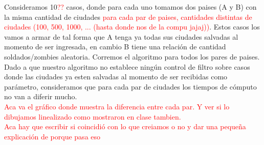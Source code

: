 Consideramos 10\textcolor{red}{??} casos, donde para cada uno tomamos dos paises (A y B) con la misma cantidad de ciudades \textcolor{red}{para cada par de paises, cantidades distintas de ciudades (100, 500, 1000, ... (hasta donde nos de la compu jajaj))}. Estos casos los vamos a armar de tal forma que A tenga ya todas sus ciudades salvadas al momento de ser ingresada, en cambio B tiene una relaci\'on de cantidad soldados/zombies aleatoria. Corremos el algoritmo para todos los pares de paises.\\

Dado a que nuestro algoritmo no establece ning\'un control de filtro sobre casos donde las ciudades ya esten salvadas al momento de ser recibidas como par\'ametro, consideramos que para cada par de ciudades los tiempos de c\'omputo no van a diferir mucho.\\

\textcolor{red}{Aca va el gr\'afico donde muestra la diferencia entre cada par. Y ver si lo dibujamos linealizado como mostraron en clase tambien.}\\

\textcolor{red}{Aca hay que escribir si coincidi\'o con lo que creiamos o no y dar una peque\~na explicaci\'on de porque pasa eso}


